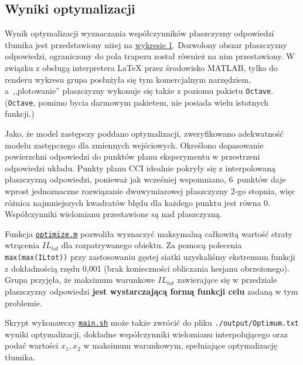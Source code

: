 \documentclass{sprawozdanie-agh}
\begin{document}
\subsection{Wyniki optymalizacji}
\par Wynik optymalizacji wyznaczania współczynników płaszczyzny odpowiedzi tłumika jest przedstawiony niżej na \hyperref[plane]{wykresie 1}. {\color{teal}Dozwolony obszar płaszczyzny odpowiedzi}, ograniczony do pola trapezu został również na nim przestawiony. W związku z obsługą interpretera \LaTeX{} przez środowisko MATLAB, tylko do renderu wykresu grupa posłużyła się tym komercjalnym narzędziem, a~,,plotowanie'' płaszczyzny wykonuje się także z poziomu pakietu \texttt{Octave}. (\texttt{Octave}, pomimo bycia darmowym pakietem, nie posiada wielu istotnych funkcji.)
\par Jako, że model zastępczy poddano optymalizacji, zweryfikowano adekwatność modelu zastępczego dla zmiennych wejściowych. Określono dopasowanie powierzchni odpowiedzi do punktów planu eksperymentu w przestrzeni odpowiedzi układu. {\color{purple}Punkty planu CCI} idealnie pokryły się z interpolowaną płaszczyzną odpowiedzi, ponieważ jak wcześniej wspomniano, 6~punktów daje wprost jednoznaczne rozwiązanie dwuwymiarowej płaszczyzny 2-go stopnia, więc różnica najmniejszych kwadratów błędu dla każdego punktu jest równa 0. Współczynniki wielomianu przestawione są nad płaszczyzną.
\par Funkcja \hyperref[list6]{\texttt{optimize.m}} pozwoliła wyznaczyć maksymalną całkowitą wartość straty wtrącenia $IL_{tot}$ dla rozpatrywanego obiektu. Za pomocą polecenia \texttt{max(max(ILtot))} przy zastosowaniu gęstej siatki uzyskaliśmy ekstremum funkcji z dokładnością rzędu 0,001 (brak konieczności obliczania hesjanu obrzeżonego). Grupa przyjęła, że maksimum warunkowe $IL_{tot}$ zawierające się w przedziale płaszczyzny odpowiedzi \textbf{jest wystarczającą formą funkcji celu} zadaną w tym problemie.
\par Skrypt wykonawczy \hyperref[list1]{\texttt{main.sh}} może także zwrócić do pliku \texttt{./output/Optimum.txt} wyniki optymalizacji, dokładne współczynniki wielomianu interpolującego oraz podać wartości $x_1, x_2$ w maksimum warunkowym, spełniające optymalizację tłumika.
\setcounter{figure}{0}
\end{document}
